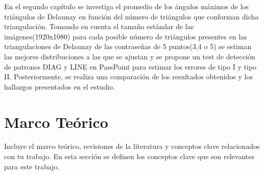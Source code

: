 \documentclass[12pt]{report}
\begin{document}
	En el segundo capítulo se investiga el promedio de los ángulos máximos de los triángulos de Delaunay en función del número de triángulos que conforman dicha triangulación. Tomando en cuenta el tamaño estándar de las imágenes(1920x1080) para cada posible número de triángulos presentes en las triangulaciones de Delaunay de las contraseñas de 5 puntos(3,4 o 5) se estiman las  mejores distribuciones a las que se ajustan y se propone un test de detección de patrones DIAG y LINE en PassPoint para estimar los errores de tipo I y tipo II. Posteriormente, se realiza una comparación de los resultados obtenidos y los hallazgos presentados en el estudio\cite{13}.
	
	
	
	
	

\setcounter{chapter}{0}
\chapter{Marco Teórico}
Incluye el marco teórico, revisiones de la literatura y conceptos clave relacionados con tu trabajo.
En esta sección se definen los conceptos clave que son relevantes para este trabajo. 
\end{document}
